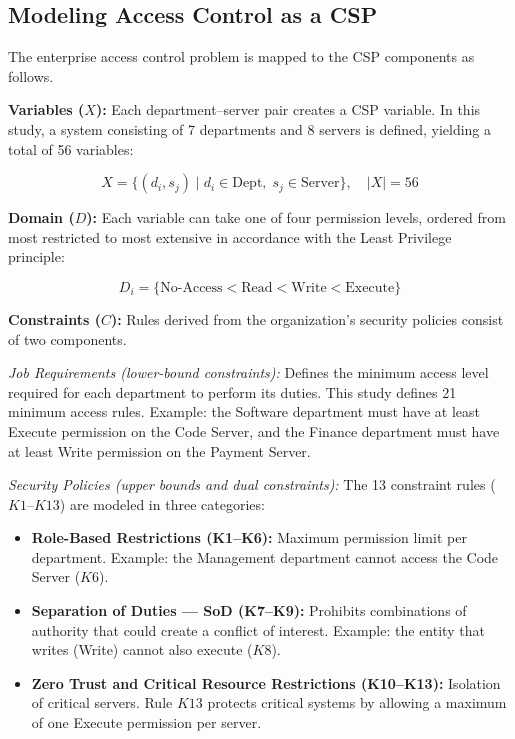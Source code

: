 \documentclass[conference]{IEEEtran}
\begin{document}
	\subsection{Modeling Access Control as a CSP}
	The enterprise access control problem is mapped to the CSP components as follows.
 
\textbf{Variables ($X$):} Each department–server pair creates a CSP variable. In
this study, a system consisting of 7 departments and 8 servers is defined, yielding
a total of 56 variables:
 
\begin{equation}
  X= \{(d_i, s_j) \mid d_i \in \text{Dept},\; s_j \in \text{Server}\},\quad |X|=56
\end{equation}
 
\textbf{Domain ($D$):} Each variable can take one of four permission levels, ordered
from most restricted to most extensive in accordance with the Least Privilege
principle:
 
\begin{equation}
  D_i = \{\text{No-Access} < \text{Read} < \text{Write} < \text{Execute}\}
\end{equation}
 
\textbf{Constraints ($C$):} Rules derived from the organization's security policies
consist of two components.
 
\textit{Job Requirements (lower-bound constraints):} Defines the minimum access level
required for each department to perform its duties. This study defines 21 minimum
access rules. Example: the Software department must have at least Execute permission
on the Code Server, and the Finance department must have at least Write permission on
the Payment Server.
 
\textit{Security Policies (upper bounds and dual constraints):} The 13 constraint
rules ($K1$–$K13$) are modeled in three categories:
 
\begin{itemize}
  \item \textbf{Role-Based Restrictions (K1–K6):} Maximum permission limit per
        department. Example: the Management department cannot access the Code Server ($K6$).
  \item \textbf{Separation of Duties — SoD (K7–K9):} Prohibits combinations of
        authority that could create a conflict of interest. Example: the entity that
        writes (Write) cannot also execute ($K8$).
  \item \textbf{Zero Trust and Critical Resource Restrictions (K10–K13):}
        Isolation of critical servers. Rule $K13$ protects critical systems by
        allowing a maximum of one Execute permission per server.
\end{itemize}
 
\end{document}
